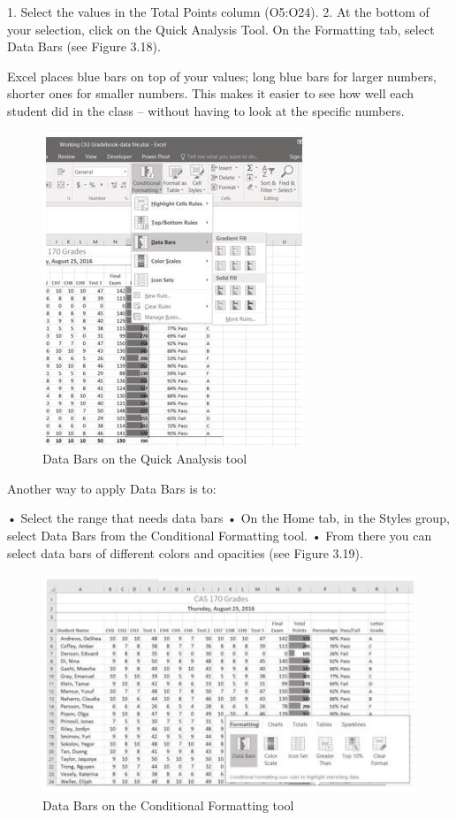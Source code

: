 1. Select the values in the Total Points column (O5:O24).
2. At the bottom of your selection, click on the Quick Analysis Tool. On the Formatting tab, select
Data Bars (see Figure 3.18).

Excel places blue bars on top of your values; long blue bars for larger numbers, shorter ones for
smaller numbers. This makes it easier to see how well each student did in the class – without having
to look at the specific numbers.


\begin{figure}[H]
	\centering
	\includegraphics[width=\maxwidth{.95\linewidth}]{gfx/ch03_fig18}
	\caption{Data Bars on the Quick Analysis tool}
	\label{03:fig18}
\end{figure}


Another way to apply Data Bars is to:

• Select the range that needs data bars
• On the Home tab, in the Styles group, select Data Bars from the Conditional Formatting tool.
• From there you can select data bars of different colors and opacities (see Figure 3.19).


\begin{figure}[H]
	\centering
	\includegraphics[width=\maxwidth{.95\linewidth}]{gfx/ch03_fig19}
	\caption{Data Bars on the Conditional Formatting tool}
	\label{03:fig19}
\end{figure}




